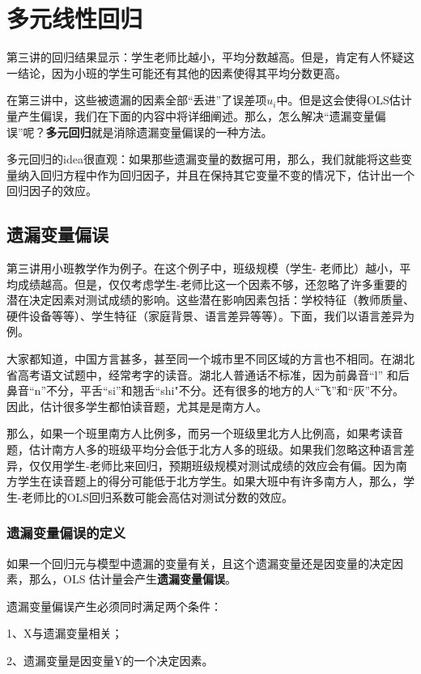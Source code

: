 \documentclass[cn,12pt,math=newtx,citestyle=gb7714-2015,bibstyle=gb7714-2015]{elegantbook}
\begin{document}
	\chapter{多元线性回归}

	第三讲的回归结果显示：学生老师比越小，平均分数越高。但是，肯定有人怀疑这一结论，因为小班的学生可能还有其他的因素使得其平均分数更高。
	
	在第三讲中，这些被遗漏的因素全部“丢进”了误差项$u_i$中。但是这会使得OLS估计量产生偏误，我们在下面的内容中将详细阐述。那么，怎么解决“遗漏变量偏误”呢？\textbf{多元回归}就是消除遗漏变量偏误的一种方法。
	
	多元回归的idea很直观：如果那些遗漏变量的数据可用，那么，我们就能将这些变量纳入回归方程中作为回归因子，并且在保持其它变量不变的情况下，估计出一个回归因子的效应。
	
	\section{遗漏变量偏误}
	第三讲用小班教学作为例子。在这个例子中，班级规模（学生- 老师比）越小，平均成绩越高。但是，仅仅考虑学生-老师比这一个因素不够，还忽略了许多重要的潜在决定因素对测试成绩的影响。这些潜在影响因素包括：学校特征（教师质量、硬件设备等等）、学生特征（家庭背景、语言差异等等）。下面，我们以语言差异为例。
	
	大家都知道，中国方言甚多，甚至同一个城市里不同区域的方言也不相同。在湖北省高考语文试题中，经常考字的读音。湖北人普通话不标准，因为前鼻音“l” 和后鼻音“n”不分，平舌“si”和翘舌“shi"不分。还有很多的地方的人“飞”和“灰”不分。因此，估计很多学生都怕读音题，尤其是是南方人。
	
	那么，如果一个班里南方人比例多，而另一个班级里北方人比例高，如果考读音题，估计南方人多的班级平均分会低于北方人多的班级。如果我们忽略这种语言差异，仅仅用学生-老师比来回归，预期班级规模对测试成绩的效应会有偏。因为南方学生在读音题上的得分可能低于北方学生。如果大班中有许多南方人，那么，学生-老师比的OLS回归系数可能会高估对测试分数的效应。
	
	\subsection{遗漏变量偏误的定义}
	如果一个回归元与模型中遗漏的变量有关，且这个遗漏变量还是因变量的决定因素，那么，OLS 估计量会产生\textbf{遗漏变量偏误}。
	
	遗漏变量偏误产生必须同时满足两个条件：
	
	1、X与遗漏变量相关；
	
	2、遗漏变量是因变量Y的一个决定因素。
	
\end{document}
